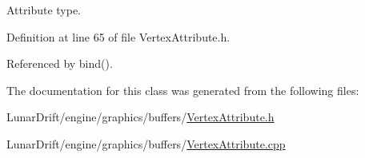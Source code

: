 Attribute type. 



Definition at line 65 of file Vertex\+Attribute.\+h.



Referenced by bind().



The documentation for this class was generated from the following files\+:\begin{DoxyCompactItemize}
\item 
Lunar\+Drift/engine/graphics/buffers/\hyperlink{_vertex_attribute_8h}{Vertex\+Attribute.\+h}\item 
Lunar\+Drift/engine/graphics/buffers/\hyperlink{_vertex_attribute_8cpp}{Vertex\+Attribute.\+cpp}\end{DoxyCompactItemize}

